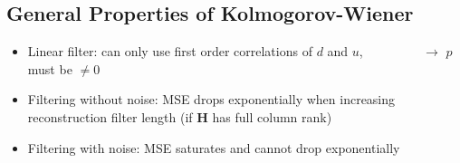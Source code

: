 \documentclass[english]{latex4ei/latex4ei_sheet}
\begin{document}
\begin{sectionbox}
  \subsection{General Properties of Kolmogorov-Wiener}
  \begin{itemize}
    \item   Linear filter: can only use first order correlations of $d$ and $u$, $\quad\quad\quad\quad$ $\rightarrow$ $p$ must be $\neq 0$
    \item   Filtering without noise: MSE drops exponentially when increasing reconstruction filter length (if $\boldsymbol{H}$ has full column rank)
    \item   Filtering with noise: MSE saturates and cannot drop exponentially
  \end{itemize}
\end{sectionbox}
\end{document}
